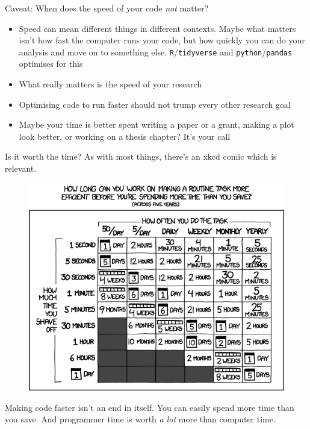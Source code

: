 \documentclass{beamer}
\begin{document}
\begin{frame}{Caveat: When does the speed of your code \emph{not} matter?}
	\begin{itemize}

		\item Speed can mean different things in different contexts. Maybe what
		matters isn't how fast the computer runs your code, but how quickly you
		can do your analysis and move on to something else.
		\texttt{R}/\texttt{tidyverse} and \texttt{python}/\texttt{pandas}
		optimises for this
		
		\item What really matters is the speed of your research  
		
		\item Optimising code to run faster should not trump every other
		research goal
		
		\item Maybe your time is better spent writing a paper or a grant, making
		a plot look better, or working on a thesis chapter? It's your call
		
	\end{itemize}
\end{frame}

\begin{frame}{Is it worth the time?}
	As with most things, there's an xkcd comic which is relevant.

	\begin{figure}
		\includegraphics[scale=0.25]{is_it_worth_the_time.png}
	\end{figure}

	Making code faster isn't an end in itself. You can easily spend more time
	than you save. And programmer time is worth \emph{a lot} more than computer
	time.
\end{frame}
\end{document}
